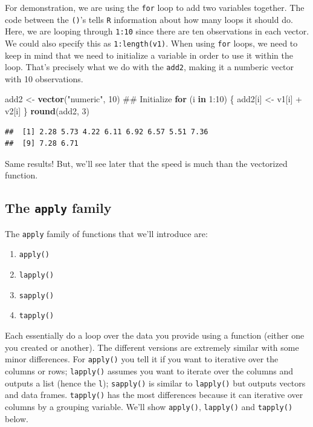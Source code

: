 \documentclass[]{tufte-book}
\newenvironment{Shaded}{}{}
\newcommand{\KeywordTok}[1]{\textcolor[rgb]{0.00,0.44,0.13}{\textbf{#1}}}
\newcommand{\DecValTok}[1]{\textcolor[rgb]{0.25,0.63,0.44}{#1}}
\newcommand{\StringTok}[1]{\textcolor[rgb]{0.25,0.44,0.63}{#1}}
\newcommand{\ControlFlowTok}[1]{\textcolor[rgb]{0.00,0.44,0.13}{\textbf{#1}}}
\newcommand{\OperatorTok}[1]{\textcolor[rgb]{0.40,0.40,0.40}{#1}}
\newcommand{\NormalTok}[1]{#1}
\providecommand{\tightlist}{%
  \setlength{\itemsep}{0pt}\setlength{\parskip}{0pt}}
\theoremstyle{definition}
\theoremstyle{definition}
\theoremstyle{remark}
\begin{document}
For demonstration, we are using the \texttt{for} loop to add two
variables together. The code between the \texttt{()}'s tells \texttt{R}
information about how many loops it should do. Here, we are looping
through \texttt{1:10} since there are ten observations in each vector.
We could also specify this as \texttt{1:length(v1)}. When using
\texttt{for} loops, we need to keep in mind that we need to initialize a
variable in order to use it within the loop. That's precisely what we do
with the \texttt{add2}, making it a numberic vector with 10
observations.

\begin{Shaded}
\begin{Highlighting}[]
\NormalTok{add2 <-}\StringTok{ }\KeywordTok{vector}\NormalTok{(}\StringTok{"numeric"}\NormalTok{, }\DecValTok{10}\NormalTok{)  ## Initialize}
\ControlFlowTok{for}\NormalTok{ (i }\ControlFlowTok{in} \DecValTok{1}\OperatorTok{:}\DecValTok{10}\NormalTok{) \{}
\NormalTok{    add2[i] <-}\StringTok{ }\NormalTok{v1[i] }\OperatorTok{+}\StringTok{ }\NormalTok{v2[i]}
\NormalTok{\}}
\KeywordTok{round}\NormalTok{(add2, }\DecValTok{3}\NormalTok{)}
\end{Highlighting}
\end{Shaded}

\begin{verbatim}
##  [1] 2.28 5.73 4.22 6.11 6.92 6.57 5.51 7.36
##  [9] 7.28 6.71
\end{verbatim}

Same results! But, we'll see later that the speed is much than the
vectorized function.

\subsection*{\texorpdfstring{The \texttt{apply}
family}{The apply family}}\label{the-apply-family}

The \texttt{apply} family of functions that we'll introduce are:

\begin{enumerate}
\def\labelenumi{\arabic{enumi}.}
\tightlist
\item
  \texttt{apply()}
\item
  \texttt{lapply()}
\item
  \texttt{sapply()}
\item
  \texttt{tapply()}
\end{enumerate}

Each essentially do a loop over the data you provide using a function
(either one you created or another). The different versions are
extremely similar with some minor differences. For \texttt{apply()} you
tell it if you want to iterative over the columns or rows;
\texttt{lapply()} assumes you want to iterate over the columns and
outputs a list (hence the \texttt{l}); \texttt{sapply()} is similar to
\texttt{lapply()} but outputs vectors and data frames. \texttt{tapply()}
has the most differences because it can iterative over columns by a
grouping variable. We'll show \texttt{apply()}, \texttt{lapply()} and
\texttt{tapply()} below.
\end{document}
